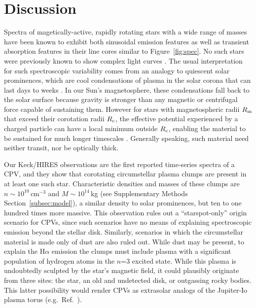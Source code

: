 \documentclass{nature3}
\begin{document}
\section{Discussion}

Spectra of magetically-active, rapidly rotating stars with a wide range
of masses have been known to exhibit both sinusoidal emission features
\cite{Donati2000,Townsend2005,Dunstone2006,Skelly2008} as well as
transient absorption features in their line cores
\cite{CollierCameron1989,CollierCameron1992,Cang2020} similar to
Figure~\ref{fig:spec}.  No such stars were previously known to show
complex light curves \cite{Bouma2024}.  The usual interpretation for
such spectroscopic variability comes from an analogy to quiescent solar
prominences, which are cool condensations of plasma in the solar corona
that can last days to weeks \cite{VialEngvold2015}.  In our Sun's
magnetosphere, these condensations fall back to the solar surface
because gravity is stronger than any magnetic or centrifugal force
capable of sustaining them.  However for stars with magnetospheric radii
$R_{\rm m}$ that exceed their corotation radii $R_{\rm c}$, the
effective potential experienced by a charged particle can have a local
minimum outside $R_{\rm c}$, enabling the material to be sustained for
much longer timescales \cite{Petit2013,Daley-Yates2024}.  Generally
speaking, such material need neither transit, nor be optically thick.

Our Keck/HIRES observations are the first reported time-series
spectra of a CPV, and they show that corotating circumstellar plasma clumps 
are present in at least one such star.
Characteristic densities and masses of these
clumps are $n \sim 10^{10}$\,cm$^{-3}$ and $M \sim 10^{14}$\,kg (see
Supplementary Methods Section~\ref{subsec:model}), a similar density
to solar prominences, but ten to one hundred times more massive.  This
observation rules out a ``starspot-only'' origin scenario for CPVs,
\cite{Koen2021} since such scenarios have no means of explaining
spectroscopic emission beyond the stellar disk.  Similarly, scenarios
in which the circumstellar material is made only of dust are also
ruled out.  While dust may be present, to explain the H$\alpha$
emission the clumps must include plasma with a
significant population of hydrogen atoms in the $n$=3 excited state.
While this plasma is undoubtedly sculpted by the star's magnetic
field, it could plausibly originate from three sites: the star, an old
and undetected disk, or outgassing rocky bodies.  This latter
possibility would render CPVs as extrasolar analogs of the Jupiter-Io
plasma torus (e.g.~Ref.~\cite{Bagenal1981}).
\end{document}
